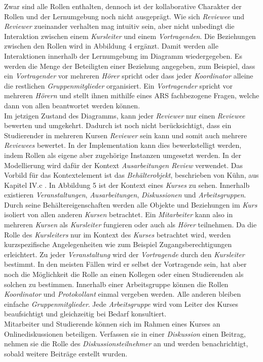 \documentclass[conference]{IEEEtran}
\begin{document}
Zwar sind alle Rollen enthalten, dennoch ist der kollaborative Charakter der Rollen und der Lernumgebung noch nicht ausgeprägt. Wie sich \textit{Reviewee} und \textit{Reviewer} zueinander verhalten mag intuitiv sein, aber nicht unbedingt die Interaktion zwischen einem \textit{Kursleiter} und einem \textit{Vortragenden}. Die Beziehungen zwischen den Rollen wird in Abbildung 4 ergänzt. Damit werden alle Interaktionen innerhalb der Lernumgebung im Diagramm wiedergegeben. Es werden die Menge der Beteiligten einer Beziehung angegeben, zum Beispiel, dass ein \textit{Vortragender} vor mehreren \textit{Hörer} spricht oder dass jeder \textit{Koordinator} alleine die restlichen \textit{Gruppenmitglieder} organisiert. Ein \textit{Vortragender} spricht vor mehreren \textit{Hörern} und stellt ihnen mithilfe eines ARS fachbezogene Fragen, welche dann von allen beantwortet werden können.\\

Im jetzigen Zustand des Diagramms, kann jeder \textit{Reviewer} nur einen \textit{Reviewee} bewerten und umgekehrt. Dadurch ist noch nicht berücksichtigt, dass ein Studierender in mehreren Kursen \textit{Reviewer} sein kann und somit auch mehrere \textit{Reviewees} bewertet. In der Implementation kann dies bewerkstelligt werden, indem Rollen als eigene aber zugehörige Instanzen umgesetzt werden. In der Modellierung wird dafür der Kontext \textit{Ausarbeitungen Review} verwendet. Das Vorbild für das Kontextelement ist das \textit{Behälterobjekt}, beschrieben von Kühn, aus Kapitel IV.c . In Abbildung 5 ist der Kontext eines \textit{Kurses} zu sehen.  Innerhalb existieren \textit{Veranstaltungen}, \textit{Ausarbeitungen}, \textit{Diskussionen} und \textit{Arbeitsgruppen}. Durch seine Behältereigenschaften werden alle Objekte und Beziehungen im \textit{Kurs} isoliert von allen anderen \textit{Kursen} betrachtet. Ein \textit{Mitarbeiter} kann also in mehreren \textit{Kursen} als \textit{Kursleiter} fungieren oder auch als \textit{Hörer} teilnehmen. Da die Rolle des \textit{Kursleiters} nur im Kontext des \textit{Kurses} betrachtet wird, werden kurzspezifische Angelegenheiten wie zum Beispiel Zugangsberechtigungen erleichtert. Zu jeder \textit{Veranstaltung} wird der \textit{Vortragende} durch den \textit{Kursleiter} bestimmt. In den meisten Fällen wird er selbst der Vortragende sein, hat aber noch die Möglichkeit die Rolle an einen Kollegen oder einen Studierenden als solchen zu bestimmen. Innerhalb einer Arbeitsgruppe können die Rollen \textit{Koordinator} und \textit{Protokollant} einmal vergeben werden. Alle anderen bleiben einfache \textit{Gruppenmitglieder}. Jede \textit{Arbeitsgruppe} wird vom Leiter des Kurses beaufsichtigt und gleichzeitig bei Bedarf konsultiert.\\ Mitarbeiter und Studierende können sich im Rahmen eines Kurses an Onlinediskussionen beteiligen. Verfassen sie in einer \textit{Diskussion} einen Beitrag, nehmen sie die Rolle des \textit{Diskussionsteilnehmer} an und werden benachrichtigt, sobald weitere Beiträge erstellt wurden. \\
\end{document}
